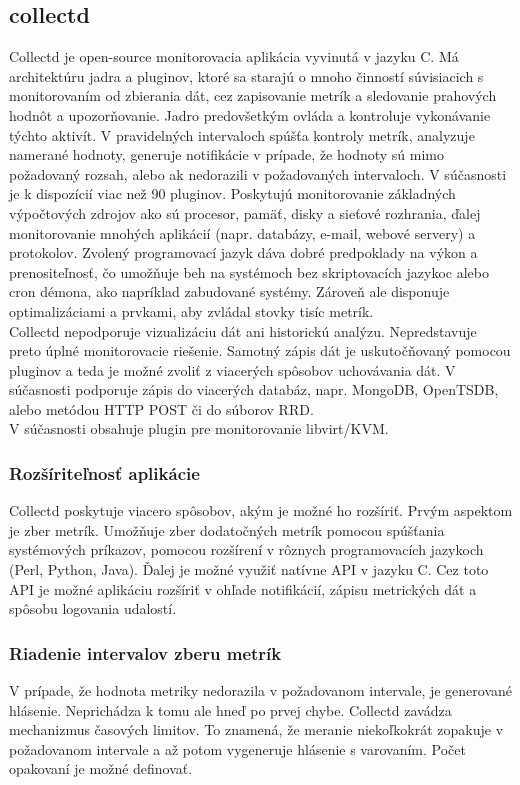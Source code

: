 \documentclass[printed,11pt,twoside,color,cover,table]{fithesis3}
\begin{document}
\subsection{collectd}
Collectd je open-source monitorovacia aplikácia vyvinutá v jazyku C. Má architektúru jadra a pluginov, ktoré sa starajú o mnoho činností súvisiacich s monitorovaním od zbierania dát, cez
zapisovanie metrík a sledovanie prahových hodnôt a upozorňovanie. Jadro predovšetkým ovláda a kontroluje vykonávanie týchto aktivít. V pravidelných intervaloch spúšťa kontroly metrík, 
analyzuje namerané hodnoty, generuje notifikácie v prípade, že hodnoty sú mimo požadovaný rozsah, alebo ak nedorazili 
v požadovaných intervaloch. V súčasnosti je k dispozícií viac než 90 pluginov. Poskytujú monitorovanie základných výpočtových zdrojov ako sú procesor, pamäť, disky a sieťové rozhrania, ďalej monitorovanie
mnohých aplikácií (napr. databázy, e-mail, webové servery) a protokolov. Zvolený programovací jazyk dáva dobré predpoklady na výkon a prenositeľnosť, čo umožňuje beh na systémoch bez 
skriptovacích jazykoc alebo cron démona, ako napríklad zabudované systémy. Zároveň ale disponuje optimalizáciami a prvkami, aby zvládal stovky tisíc metrík.\cite{collectd} 
\\Collectd nepodporuje vizualizáciu dát ani historickú analýzu. Nepredstavuje preto úplné monitorovacie riešenie. Samotný zápis dát je uskutočňovaný pomocou pluginov a 
teda je možné zvoliť z viacerých spôsobov uchovávania dát. V súčasnosti podporuje zápis do viacerých databáz, napr. MongoDB, OpenTSDB, alebo metódou HTTP POST či do súborov RRD. 
\\V súčasnosti obsahuje plugin pre monitorovanie libvirt/KVM.

\subsubsection{Rozšíriteľnosť aplikácie}
Collectd poskytuje viacero spôsobov, akým je možné ho rozšíriť. Prvým aspektom je zber metrík. Umožňuje zber dodatočných metrík pomocou
spúšťania systémových príkazov, pomocou rozšírení v rôznych programovacích jazykoch (Perl, Python, Java). Ďalej je možné využiť natívne
API v jazyku C. Cez toto API je možné aplikáciu rozšíriť v ohľade notifikácií, zápisu metrických dát a spôsobu logovania udalostí.

\subsubsection{Riadenie intervalov zberu metrík}
V prípade, že hodnota metriky nedorazila v požadovanom intervale, je generované hlásenie. Neprichádza k tomu ale hneď po prvej chybe. Collectd zavádza mechanizmus časových limitov.
To znamená, že meranie niekoľkokrát zopakuje v požadovanom intervale a až potom vygeneruje hlásenie s varovaním. Počet opakovaní
je možné definovať. 
\end{document}
